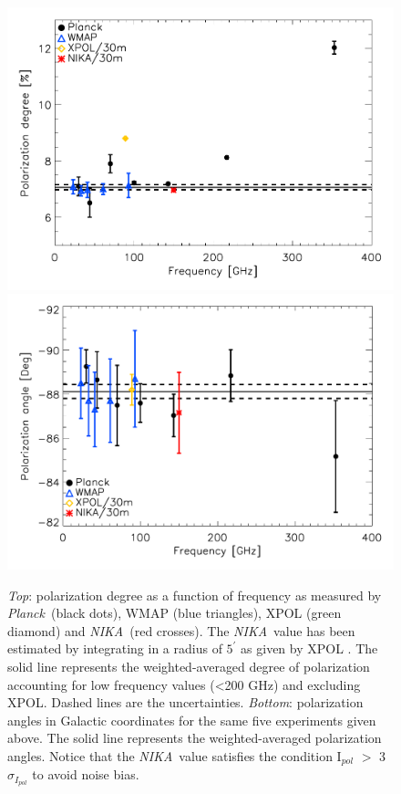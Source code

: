 \documentclass[twocolumn,traditabstract]{aa}
\def\NIKA{\textit{NIKA}}
\def\Planck{\textit{Planck}}
\begin{document}
  

\begin{figure}
  \centering
          { \includegraphics[width=1\linewidth,keepaspectratio]{figures/pdegree_comparison.pdf}}
          { \includegraphics[width=1\linewidth,keepaspectratio]{figures/angle_comparison.pdf}} 
            \caption{{\it Top}: polarization degree as a function of frequency as measured by \Planck\ (black dots), WMAP (blue triangles), XPOL (green diamond) and \NIKA\ (red crosses). The \NIKA\ value has been estimated by integrating in a radius of $5^{\prime}$ as given by XPOL \citep{aumont2010}. The solid line represents the weighted-averaged degree of polarization accounting for low frequency values (\textless 200 GHz) and excluding XPOL.
            Dashed lines are the uncertainties.
            {\it Bottom}: polarization angles in Galactic coordinates for the same five experiments given above. The solid line represents the weighted-averaged polarization angles. Notice that the \NIKA\ value satisfies the condition I$_{pol}$ $>$ 3$\sigma_{I_{pol}}$ to avoid noise bias.} %
\label{crab_p_angle_comparison}		
  \end{figure}
\end{document}
